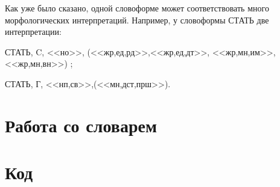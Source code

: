\documentclass[12pt,a4paper,onecolumn]{report}
\begin{document}
Как уже было сказано, одной словоформе может соответствовать много морфологических интерпретаций. Например, у словоформы СТАТЬ две интерпретации:

{СТАТЬ, C, <<но>>, (<<жр,ед,рд>>,<<жр,ед,дт>>, <<жр,мн,им>>, <<жр,мн,вн>>) };

{СТАТЬ, Г, <<нп,св>>,(<<мн,дст,прш>>)}.
\chapter{Работа со словарем}

\chapter{Код}

\end{document}
